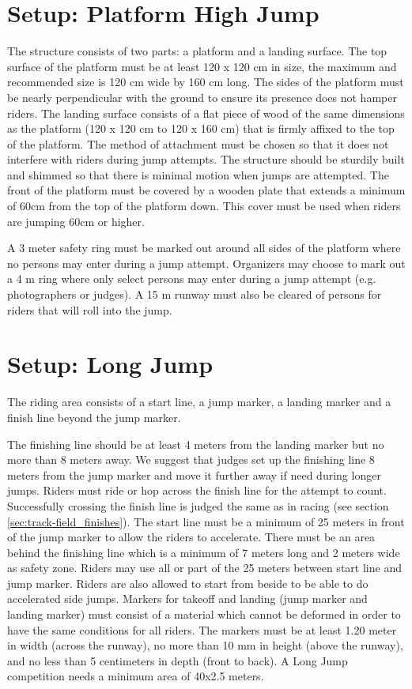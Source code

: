 \section{Setup: Platform High Jump}
The structure consists of two parts: a platform and a landing surface.
The top surface of the platform must be at least 120 x 120 cm in size, the maximum and recommended size is 120 cm wide by 160 cm long.
The sides of the platform must be nearly perpendicular with the ground to ensure its presence does not hamper riders.
The landing surface consists of a flat piece of wood of the same dimensions as the platform (120 x 120 cm to 120 x 160 cm) that is firmly affixed to the top of the platform.
The method of attachment must be chosen so that it does not interfere with riders during jump attempts.
The structure should be sturdily built and shimmed so that there is minimal motion when jumps are attempted.
The front of the platform must be covered by a wooden plate that extends a minimum of 60cm from the top of the platform down.
This cover must be used when riders are jumping 60cm or higher.

A 3 meter safety ring must be marked out around all sides of the platform where no persons may enter during a jump attempt.
Organizers may choose to mark out a 4 m ring where only select persons may enter during a jump attempt (e.g. photographers or judges).
A 15 m runway must also be cleared of persons for riders that will roll into the jump.

\section{Setup: Long Jump}
The riding area consists of a start line, a jump marker, a landing marker and a finish line beyond the jump marker.

The finishing line should be at least 4 meters from the landing marker but no more than 8 meters away.
We suggest that judges set up the finishing line 8 meters from the jump marker and move it further away if need during longer jumps.
Riders must ride or hop across the finish line for the attempt to count.
Successfully crossing the finish line is judged the same as in racing (see section \ref{sec:track-field_finishes}).
The start line must be a minimum of 25 meters in front of the jump marker to allow the riders to accelerate.
There must be an area behind the finishing line which is a minimum of 7 meters long and 2 meters wide as safety zone.
Riders may use all or part of the 25 meters between start line and jump marker.
Riders are also allowed to start from beside to be able to do accelerated side jumps.
Markers for takeoff and landing (jump marker and landing marker) must consist of a material which cannot be deformed in order to have the same conditions for all riders.
The markers must be at least 1.20 meter in width (across the runway), no more than 10 mm in height (above the runway), and no less than 5 centimeters in depth (front to back).
A Long Jump competition needs a minimum area of 40x2.5 meters.


